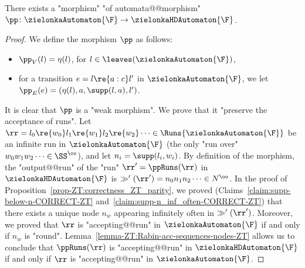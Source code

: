 \documentclass{theoretics}
\begin{document}
\begin{lemma}\label{lemma-ZT:morphism-parity-Rabin}
	There exists a "morphism" "of automata@@morphism" $\pp\colon \zielonkaAutomaton{\F} \to \zielonkaHDAutomaton{\F}$.
\end{lemma}
\begin{proof}
	We define the morphism $\pp$ as follows:
	\begin{itemize}
		\item $\pp_V(l) = \eta(l)$, for $l\in \leaves(\zielonkaAutomaton{\F})$,
		\item for a transition $e = l\re{a:c} l'$ in $\zielonkaAutomaton{\F}$, we let $\pp_E(e) = (\eta(l), a, \supp(l,a), l')$.
	\end{itemize}
	It is clear that $\pp$ is a "weak morphism". We prove that it "preserve the acceptance of runs". Let $\rr = l_0\re{w_0}l_1\re{w_1}l_2\re{w_2}\dots \in \Runs{\zielonkaAutomaton{\F}}$ be an infinite run in $\zielonkaAutomaton{\F}$ (the only "run over" $w_0w_1w_2\dots \in \SS^\oo$), and let $n_i = \supp(l_i,w_i)$. By definition of the morphism, the "output@@run" of the "run" $\rr' = \ppRuns(\rr)$ in $\zielonkaHDAutomaton{\F}$ is $\gg'(\rr') = n_0n_1n_2\dots \in N^\oo$. In the proof of Proposition~\ref{prop-ZT:correctness_ZT_parity}, we proved (Claims~\ref{claim:supp-below-n-CORRECT-ZT} and~\ref{claim:supp-n_inf_often-CORRECT-ZT}) that there exists a unique node $n_w$ appearing infinitely often in $\gg'(\rr')$. Moreover, we proved that $\rr$ is "accepting@@run" in $\zielonkaAutomaton{\F}$ if and only if $n_w$ is "round". Lemma~\ref{lemma-ZT:Rabin-acc-sequences-nodes-ZT} allows us to conclude that $\ppRuns(\rr)$ is "accepting@@run" in $\zielonkaHDAutomaton{\F}$ if and only if $\rr$ is "accepting@@run" in $\zielonkaAutomaton{\F}$.
\end{proof}
\end{document}
